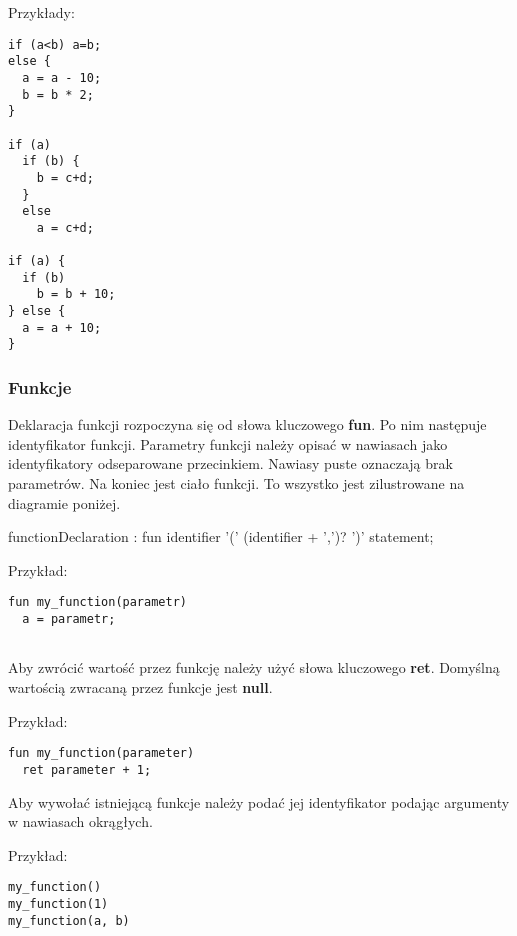 \documentclass[12pt,a4paper]{article}
\begin{document}
Przykłady:
\lstset{language=Python}
\begin{lstlisting}
if (a<b) a=b;
else {
  a = a - 10;
  b = b * 2;
}

if (a)
  if (b) {
    b = c+d;
  }
  else
    a = c+d;
    
if (a) {
  if (b)
    b = b + 10;
} else { 
  a = a + 10;
}

\end{lstlisting}

\pagebreak

\subsubsection{Funkcje}

Deklaracja funkcji rozpoczyna się od słowa kluczowego \textbf{fun}.
Po nim następuje identyfikator funkcji. Parametry funkcji należy opisać w nawiasach jako identyfikatory odseparowane przecinkiem. Nawiasy puste oznaczają brak parametrów. Na koniec jest ciało funkcji. To wszystko jest zilustrowane na diagramie poniżej.

\begin{rail}

functionDeclaration : fun identifier '(' (identifier + ',')? ')' statement;

\end{rail}

Przykład:

\begin{lstlisting}
fun my_function(parametr)
  a = parametr;
  
\end{lstlisting}

Aby zwrócić wartość przez funkcję należy użyć słowa kluczowego \textbf{ret}. Domyślną wartością zwracaną przez funkcje jest \textbf{null}.

\medskip
Przykład:

\begin{lstlisting}
fun my_function(parameter)
  ret parameter + 1;

\end{lstlisting}

Aby wywołać istniejącą funkcje należy podać jej identyfikator podając argumenty w nawiasach okrągłych.

\medskip
Przykład:

\begin{lstlisting}
my_function()
my_function(1)
my_function(a, b)
\end{lstlisting}
\end{document}
